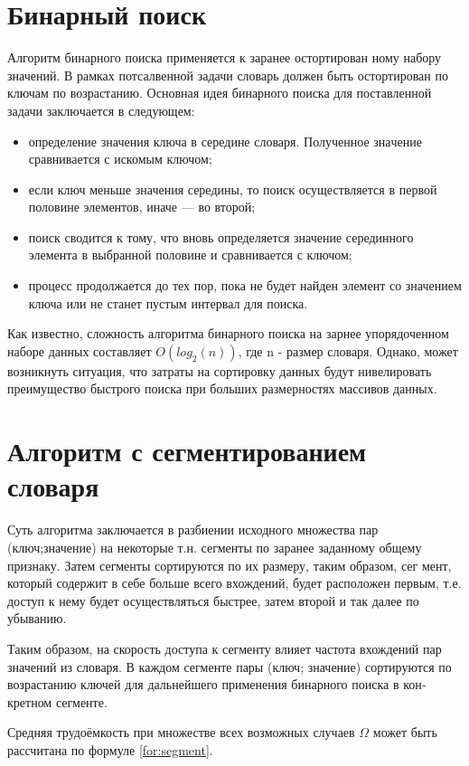 \section{Бинарный поиск}

Алгоритм бинарного поиска применяется к заранее остортирован­
ному набору значений. В рамках потсалвенной задачи словарь должен быть остортирован по ключам по возрастанию. Основная идея бинарного поиска для поставленной задачи заклю­чается в следующем:
\begin{itemize}
	\item определение значения ключа в середине словаря. Полученное зна­чение сравнивается с искомым ключом;
	\item если ключ меньше значения середины, то поиск осуществляется
	в первой половине элементов, иначе — во второй;
	\item поиск сводится к тому, что вновь определяется значение середин­ного элемента в выбранной половине и сравнивается с ключом;
	\item процесс продолжается до тех пор, пока не будет найден элемент со значением ключа или не станет пустым интервал для поиска.
\end{itemize}
Как известно, сложность алгоритма бинарного поиска на зарнее
упорядоченном наборе данных составляет $O(log_2(n))$, где n - размер словаря.
Однако, может возникнуть ситуация, что затраты на сортировку
данных будут нивелировать преимущество быстрого поиска при больших размерностях массивов данных.

\section{Алгоритм с сегментированием словаря}

Суть алгоритма за­ключается в разбиении исходного множества пар (ключ;значение) на некоторые т.н. сегменты по заранее заданному общему признаку.
Затем сегменты сортируются по их размеру, таким образом, сег­
мент, который содержит в себе больше всего вхождений, будет распо­ложен первым, т.е. доступ к нему будет осуществляться быстрее, затем второй и так далее по убыванию.

Таким образом, на скорость доступа к сегменту влияет частота
вхождений пар значений из словаря. В каждом сегменте пары (ключ; значение) сортируются по воз­растанию ключей для дальнейшего применения бинарного поиска в кон­кретном сегменте.


Средняя трудоёмкость при множестве всех возможных случаев $\Omega$ может быть рассчитана по формуле \ref{for:segment}.

